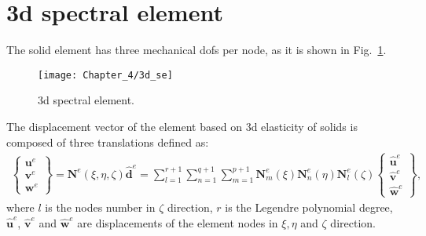\section{\acs{3d} spectral element}
\label{sec:3Dmodel}

The solid element has three mechanical \acp{dof} per node, as it is shown in Fig.~\ref{fig:3d_se}.
\begin{figure}
	\begin{center}
		\texttt{[image: Chapter\_4/3d\_se]}
	\end{center}
	\caption{\Acf{3d} spectral element.}
	\label{fig:3d_se}
\end{figure}
The displacement vector of the element based on \ac{3d} elasticity of solids is composed of three translations defined as:
\begin{eqnarray}
	\left \{ \begin{array}{c}
		\textbf{u}^e\\
		\textbf{v}^e\\
		\textbf{w}^e
	\end{array} \right\} = \textbf{N}^e(\xi,\eta, \zeta)\widehat{\textbf{d}}^e = \sum_{l=1}^{r+1}\sum_{n=1}^{q+1}\sum_{m=1}^{p+1}\textbf{N}_m^e(\xi)\textbf{N}_n^e(\eta)\textbf{N}_l^e(\zeta)
	\left \{ \begin{array}{c}
		\widehat{\textbf{u}}^e\\
		\widehat{\textbf{v}}^e\\
		\widehat{\textbf{w}}^e
	\end{array} \right\},
	\label{eq:3D_displ}
\end{eqnarray}
where \(l\) is the nodes number in \(\zeta\) direction, \(r\) is the Legendre polynomial degree, \(\widehat{\textbf{u}}^e\), \(\widehat{\textbf{v}}^e\) and 
\(\widehat{\textbf{w}}^e\) are displacements of the element nodes in \(\xi,\eta\) and \(\zeta\) direction.

